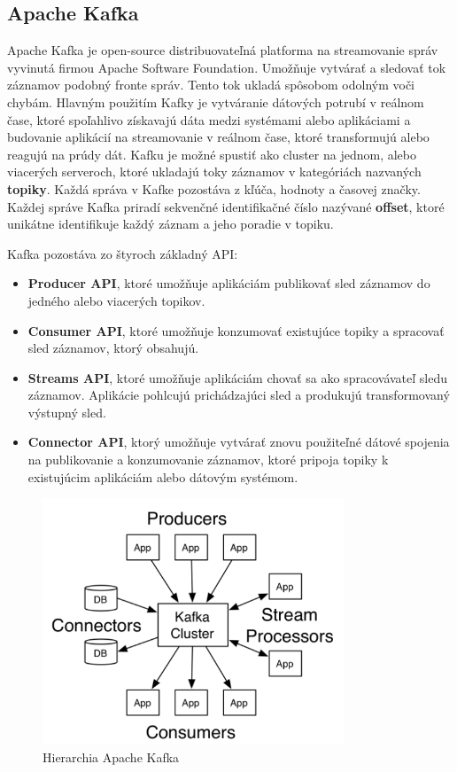 \subsection{Apache Kafka}
Apache Kafka je open-source distribuovateľná platforma na streamovanie správ vyvinutá firmou Apache Software Foundation. Umožňuje vytvárať a sledovať tok záznamov podobný fronte správ. Tento tok ukladá spôsobom odolným voči chybám. Hlavným použitím Kafky je vytváranie dátových potrubí v reálnom čase, ktoré spoľahlivo získavajú dáta medzi systémami alebo aplikáciami a budovanie aplikácií na streamovanie v reálnom čase, ktoré transformujú alebo reagujú na prúdy dát. Kafku je možné spustiť ako cluster na jednom, alebo viacerých serveroch, ktoré ukladajú toky záznamov v kategóriách nazvaných \textbf{topiky}. Každá správa v Kafke pozostáva z kľúča, hodnoty a časovej značky. Každej správe Kafka priradí sekvenčné identifikačné číslo nazývané \textbf{offset}, ktoré unikátne identifikuje každý záznam a jeho poradie v topiku.

Kafka pozostáva zo štyroch základný API:\cite{Kafka}
\begin{itemize}
\item \textbf{Producer API}, ktoré umožňuje aplikáciám publikovať sled záznamov do jedného alebo viacerých topikov.
\item \textbf{Consumer API}, ktoré umožňuje konzumovať existujúce topiky a spracovať sled záznamov, ktorý obsahujú.
\item \textbf{Streams API}, ktoré umožňuje aplikáciám chovať sa ako spracovávateľ sledu záznamov. Aplikácie pohlcujú prichádzajúci sled a produkujú transformovaný výstupný sled.
\item \textbf{Connector API}, ktorý umožňuje vytvárať znovu použiteľné dátové spojenia na publikovanie a konzumovanie záznamov, ktoré pripoja topiky k existujúcim aplikáciám alebo dátovým systémom.
\end{itemize}

\begin{figure}[H]
\begin{center}
\includegraphics[width=9cm]{figures/kafka_hierarchy.PNG}
\caption{Hierarchia Apache Kafka}
\label{fig:kafka_hierarchy}
\end{center}
\end{figure}

